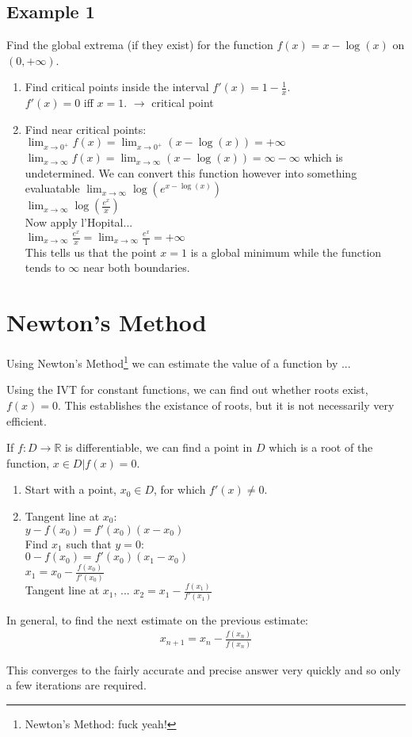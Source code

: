 \subsection{Example 1}
Find the global extrema (if they exist) for the function
$f(x) = x - \log(x)$ on $(0,+\infty)$.

\begin{enumerate}
  \item Find critical points inside the interval
  $f'(x) = 1 - \frac{1}{x}$. \\
  $f'(x) = 0$ iff $x=1$. $\to$ critical point \\
  \item Find near critical points: \\
  $\lim_{x \to 0^+} f(x) = \lim_{x \to 0^+} (x - \log(x)) = +\infty$ \\
  $\lim_{x \to \infty} f(x) = \lim_{x \to \infty} (x - \log(x)) = \infty - \infty$
  which is undetermined. We can convert this function however into something evaluatable
  $\lim_{x \to \infty} \log(e^{x - \log(x)})$ \\
  $\lim_{x \to \infty} \log(\frac{e^x}{x})$ \\
  Now apply l'Hopital... \\
  $\lim_{x \to \infty} \frac{e^x}{x} = \lim_{x \to \infty} \frac{e^x}{1} = +\infty$\\
  This tells us that the point $x=1$ is a global minimum while the function
  tends to $\infty$ near both boundaries.
\end{enumerate}

\section{Newton's Method}
Using Newton's Method\footnote{Newton's Method: fuck yeah!} we can estimate the
value of a function by ...

Using the IVT for constant functions, we can find out whether roots exist,
$f(x)=0$. This establishes the existance of roots, but it is not necessarily
very efficient.

If $f: D \to \mathbb{R}$ is differentiable, we can find a point in $D$ which is
a root of the function, $x \in D | f(x) = 0$.

\begin{enumerate}
  \item Start with a point, $x_0 \in D$, for which $f'(x) \neq 0$.
  \item Tangent line at $x_0$: \\
  $y - f(x_0) = f'(x_0)(x-x_0)$ \\
  Find $x_1$ such that $y=0$: \\
  $0-f(x_0) = f'(x_0)(x_1 - x_0)$ \\
  $x_1 = x_0 - \frac{f(x_0)}{f'(x_0)}$ \\
  Tangent line at $x_1$, ...
  $x_2 = x_1 - \frac{f(x_1)}{f'(x_1)}$ \\
\end{enumerate}
In general, to find the next estimate on the previous estimate:
\begin{align}
  x_{n+1} = x_n - \frac{f(x_n)}{f(x_n)}
\end{align}

This converges to the fairly accurate and precise answer very quickly and so
only a few iterations are required.
